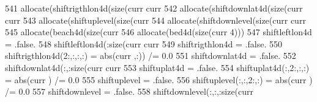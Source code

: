 \begin{DoxyCode}
541                 \textcolor{keyword}{allocate}(shiftrigthlon4d(\textcolor{keyword}{size}(curr%
      curr%
542                 \textcolor{keyword}{allocate}(shiftdownlat4d(\textcolor{keyword}{size}(curr%
      curr%
543                 \textcolor{keyword}{allocate}(shiftuplevel(\textcolor{keyword}{size}(curr%
544                 \textcolor{keyword}{allocate}(shiftdownlevel(\textcolor{keyword}{size}(curr%
      curr%
545                 \textcolor{keyword}{allocate}(beach4d(\textcolor{keyword}{size}(curr%
546                 \textcolor{keyword}{allocate}(bed4d(\textcolor{keyword}{size}(curr%
      4)))
547                 shiftleftlon4d = .false.
548                 shiftleftlon4d(:\textcolor{keyword}{size}(curr%
       curr%
549                 shiftrigthlon4d = .false.
550                 shiftrigthlon4d(2:,:,:,:) = abs(curr%
      ,:)) /= 0.0
551                 shiftdownlat4d = .false.
552                 shiftdownlat4d(:,:\textcolor{keyword}{size}(curr%
       curr%
553                 shiftuplat4d = .false.
554                 shiftuplat4d(:,2:,:,:) = abs(curr%
      ) /= 0.0
555                 shiftuplevel = .false.
556                 shiftuplevel(:,:,2:,:) = abs(curr%
      ) /= 0.0
557                 shiftdownlevel = .false.
558                 shiftdownlevel(:,:,:\textcolor{keyword}{size}(curr%

\end{DoxyCode}
